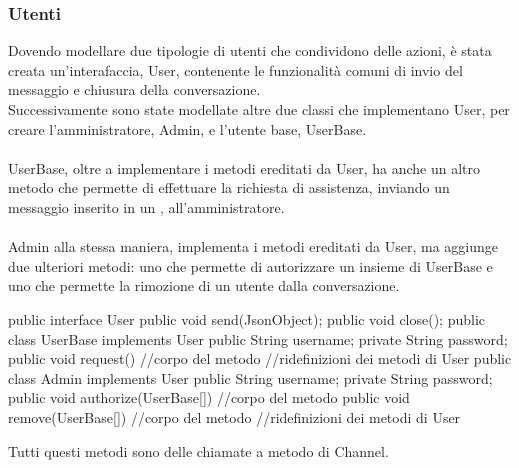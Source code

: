       \subsubsection*{Utenti}
        Dovendo modellare due tipologie di utenti che condividono delle azioni, è stata creata un'interafaccia, User, contenente le funzionalità comuni di invio del messaggio e chiusura della conversazione.\\
        Successivamente sono state modellate altre due classi che implementano User, per creare l'amministratore, Admin, e l'utente base, UserBase.\\\\
        UserBase, oltre a implementare i metodi ereditati da User, ha anche un altro metodo che permette di effettuare la richiesta di assistenza, inviando un messaggio inserito in un , all'amministratore.\\\\
        Admin alla stessa maniera, implementa i metodi ereditati da User, ma aggiunge due ulteriori metodi: uno che permette di autorizzare un insieme di UserBase e uno che permette la rimozione di un utente dalla conversazione.\\
        \begin{codice_java}
          public interface User{
            public void send(JsonObject);
            public void close();
          }
          public class UserBase implements User{
            public String username;
            private String password;
            public void request(){
              //corpo del metodo
            }
            //ridefinizioni dei metodi di User
          }
          public class Admin implements User{
            public String username;
            private String password;
            public void authorize(UserBase[]){
              //corpo del metodo
            }
            public void remove(UserBase[]){
              //corpo del metodo
            }
            //ridefinizioni dei metodi di User
          }
        \end{codice_java}
        Tutti questi metodi sono delle chiamate a metodo di Channel.

      \newpage
